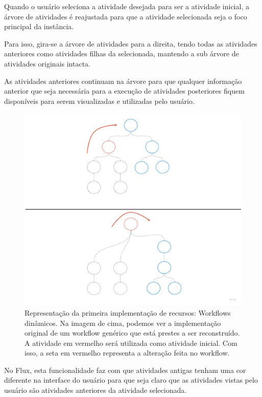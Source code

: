 Quando o usuário seleciona a atividade desejada para ser a atividade inicial, a árvore de atividades é reajustada para que a atividade selecionada seja o foco principal da instância.

Para isso, gira-se a árvore de atividades para a direita, tendo todas as atividades anteriores como atividades filhas da selecionada, mantendo a sub árvore de atividades originais intacta.

As atividades anteriores continuam na árvore para que qualquer informação anterior que seja necessária para a execução de atividades posteriores fiquem disponíveis para serem visualizadas e utilizadas pelo usuário.

\begin{figure}
    \centering
    \includegraphics[width=1\textwidth]{imgs/Implementacoes/primeiraImplementacao.png}
    \caption{Representação da primeira implementação de recursos: Workflows dinâmicos. Na imagem de cima, podemos ver a implementação original de um workflow genérico que está prestes a ser reconstruído. A atividade em vermelho será utilizada como atividade inicial. Com isso, a seta em vermelho representa a alteração feita no workflow.}
    \label{fig:primeira_implementacao}
\end{figure}

No Flux, esta funcionalidade faz com que atividades antigas tenham uma cor diferente na interface do usuário para que seja claro que as atividades vistas pelo usuário são atividades anteriores da atividade selecionada.

